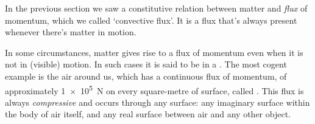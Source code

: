 \label{nsec:matter_const_thermodynamics}

In the previous section we saw a constitutive relation between matter and \emph{flux} of momentum, which we called \enquote*{convective flux}. It is a flux that's always present whenever there's matter in motion.

In some circumstances, matter gives rise to a flux of momentum even when it is not in (visible) motion. In such cases it is said to be in a . The most cogent example is the air around us, which has a continuous flux of momentum, of approximately \qty[print-unity-mantissa=false]{1e5}{N} on every square-metre of surface, called . This flux is always {\emph{compressive}} and occurs through any surface: any imaginary surface within the body of air itself, and any real surface between air and any other object.

\smallskip

